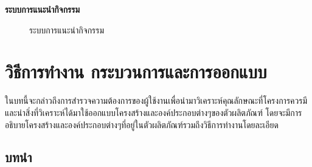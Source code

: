 \documentclass[14pt,oneside,openright,a4paper]{cpe-thai-project}
\begin{document}
\newpage

\large\textbf{ระบบการแนะนำกิจกรรม} \large

  \begin{figure}[!h]\centering
    \setlength{\fboxrule}{0.5mm} %
    \setlength{\fboxsep}{0.5cm}
    \caption{ระบบการแนะนำกิจกรรม}\label{fig:Suggest}
    \end{figure}

\chapter{วิธีการทำงาน กระบวนการและการออกแบบ}
ในบทนี้จะกล่าวถึงการสำรวจความต้องการของผู้ใช้งานเพื่อนำมาวิเคราะห์คุณลักษณะที่โครงการควรมี และนำสิ่งที่วิเคราะห์ได้มาใช้ออกแบบโครงสร้างและองค์ประกอบต่างๆของตัวผลิตภัณฑ์ โดยจะมีการอธิบายโครงสร้างและองค์ประกอบต่างๆที่อยู่ในตัวผลิตภัณฑ์รวมถึงวิธีการทำงานโดยละเอียด
\section{บทนำ}
\end{document}
